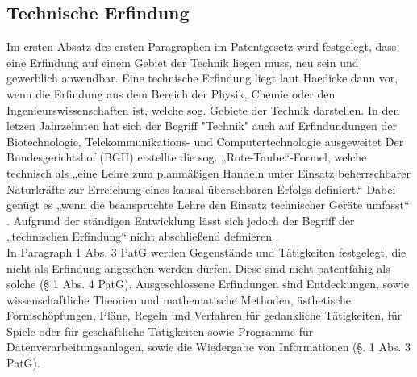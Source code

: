 \subsection{Technische Erfindung}

Im ersten Absatz des ersten Paragraphen im Patentgesetz wird festgelegt,
dass eine Erfindung auf einem Gebiet der Technik liegen muss, neu sein und
gewerblich anwendbar.
Eine technische Erfindung liegt laut Haedicke dann vor, 
wenn die Erfindung aus dem Bereich der Physik, 
Chemie oder den Ingenieurswissenschaften ist, 
welche sog. Gebiete der Technik darstellen.
In den letzen Jahrzehnten hat sich der Begriff 
"Technik" auch auf Erfindundungen der Biotechnologie, 
Telekommunikations- und Computertechnologie ausgeweitet 
\cite{haedickeEinfuhrung2020}
Der Bundesgerichtshof (BGH) erstellte die
sog. „Rote-Taube“-Formel, welche technisch als  
„eine Lehre zum planmäßigen Handeln 
unter Einsatz beherrschbarer Naturkräfte zur Erreichung eines 
kausal übersehbaren Erfolgs definiert.“\cite{BGH27031969}  
Dabei genügt es „wenn die beanspruchte Lehre den Einsatz technischer Geräte umfasst“
\cite{BGH3020152015}\cite{BGH2420112011a}. 
Aufgrund der ständigen Entwicklung lässt sich 
jedoch der Begriff der „technischen Erfindung“ 
nicht abschließend definieren \cite{haedickeEinfuhrung2020}.
\\
In Paragraph 1 Abs. 3 PatG werden Gegenstände und Tätigkeiten festgelegt, 
die nicht als Erfindung angesehen werden dürfen. 
Diese sind nicht patentfähig als solche (§ 1 Abs. 4 PatG). 
Ausgeschlossene Erfindungen sind Entdeckungen, 
sowie wissenschaftliche Theorien und mathematische Methoden, 
ästhetische Formschöpfungen, Pläne, Regeln und Verfahren für gedankliche Tätigkeiten, 
für Spiele 
oder für geschäftliche Tätigkeiten sowie Programme für Datenverarbeitungsanlagen, 
sowie die Wiedergabe von Informationen (§. 1 Abs. 3 PatG). 
\\

